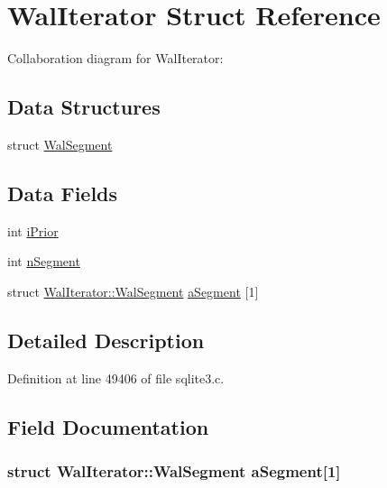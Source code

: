 \hypertarget{struct_wal_iterator}{}\section{Wal\+Iterator Struct Reference}
\label{struct_wal_iterator}


Collaboration diagram for Wal\+Iterator\+:
\subsection*{Data Structures}
\begin{DoxyCompactItemize}
\item 
struct \hyperlink{struct_wal_iterator_1_1_wal_segment}{Wal\+Segment}
\end{DoxyCompactItemize}
\subsection*{Data Fields}
\begin{DoxyCompactItemize}
\item 
int \hyperlink{struct_wal_iterator_a92ff55de6843760938bdac08a9ed69f8}{i\+Prior}
\item 
int \hyperlink{struct_wal_iterator_a8f89d325bc616cb72479c74b15841b8f}{n\+Segment}
\item 
struct \hyperlink{struct_wal_iterator_1_1_wal_segment}{Wal\+Iterator\+::\+Wal\+Segment} \hyperlink{struct_wal_iterator_a36f39d3ba291b01786747cd94024e79a}{a\+Segment} \mbox{[}1\mbox{]}
\end{DoxyCompactItemize}


\subsection{Detailed Description}


Definition at line 49406 of file sqlite3.\+c.



\subsection{Field Documentation}
\hypertarget{struct_wal_iterator_a36f39d3ba291b01786747cd94024e79a}{}
\subsubsection[{a\+Segment}]{\setlength{\rightskip}{0pt plus 5cm}struct {\bf Wal\+Iterator\+::\+Wal\+Segment}  a\+Segment\mbox{[}1\mbox{]}}\label{struct_wal_iterator_a36f39d3ba291b01786747cd94024e79a}
\hypertarget{struct_wal_iterator_a92ff55de6843760938bdac08a9ed69f8}{}
